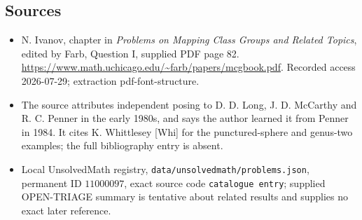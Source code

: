 \documentclass[11pt]{article}
\begin{document}
\subsection{Sources}
\begin{itemize}
\item N. Ivanov, chapter in \emph{Problems on Mapping Class Groups and Related Topics}, edited by Farb, Question I, supplied PDF page 82. \url{https://www.math.uchicago.edu/~farb/papers/mcgbook.pdf}. Recorded access 2026-07-29; extraction pdf-font-structure.
\item The source attributes independent posing to D. D. Long, J. D. McCarthy and R. C. Penner in the early 1980s, and says the author learned it from Penner in 1984. It cites K. Whittlesey [Whi] for the punctured-sphere and genus-two examples; the full bibliography entry is absent.
\item Local UnsolvedMath registry, \texttt{data/unsolvedmath/problems.json}, permanent ID \(11000097\), exact source code \texttt{catalogue entry}; supplied OPEN-TRIAGE summary is tentative about related results and supplies no exact later reference.
\end{itemize}
\end{document}
